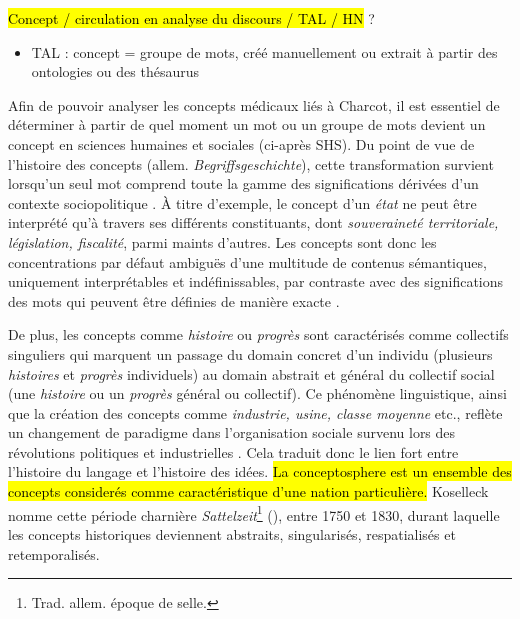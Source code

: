  \hl{Concept / circulation en analyse du discours / TAL / HN} ?  
\begin{itemize}
\item TAL : concept = groupe de mots, créé manuellement ou extrait à partir des ontologies ou des thésaurus
\end{itemize}



Afin de pouvoir analyser les concepts médicaux liés à Charcot, il est essentiel de déterminer à partir de quel moment un mot ou un groupe de mots devient un concept en sciences humaines et sociales (ci-après SHS). Du point de vue de l'histoire des concepts (allem. \textit{Begriffsgeschichte}), cette transformation survient lorsqu'un seul mot comprend toute la gamme des significations dérivées d'un contexte sociopolitique \citep[p. 258]{koselleck2011introduction}. À titre d'exemple, le concept d'un \textit{état} ne peut être interprété qu'à travers ses différents constituants, dont \textit{souveraineté territoriale, législation, fiscalité}, parmi maints d'autres. Les concepts sont donc les concentrations par défaut ambiguës d'une multitude de contenus sémantiques, uniquement interprétables et indéfinissables, par contraste avec des significations des mots qui peuvent être définies de manière exacte \citep[p. 20]{koselleck2011introduction}. 

De plus, les concepts comme \textit{histoire} ou \textit{progrès} sont caractérisés comme \og{}collectifs singuliers\fg{} qui marquent un passage du domain concret d'un individu (plusieurs \textit{histoires} et \textit{progrès} individuels) au domain abstrait et général du collectif social (une \textit{histoire} ou un \textit{progrès} général ou collectif).  Ce phénomène linguistique, ainsi que la création des concepts comme \textit{industrie, usine, classe moyenne} etc., reflète un changement de paradigme dans l'organisation sociale survenu lors des révolutions politiques et industrielles \citep[p. 1]{hobsbawm2010age}. Cela traduit donc le lien fort entre l'histoire du langage et l'histoire des idées. \hl{La conceptosphere est un ensemble des concepts considerés comme caractéristique d'une nation particulière.} Koselleck nomme cette période charnière \textit{Sattelzeit}\footnote{Trad. allem. \og{}époque de selle\fg{}.} (\citeyear[p. 8]{koselleck2011introduction}), entre 1750 et 1830, durant laquelle les concepts historiques deviennent abstraits, singularisés, respatialisés et retemporalisés.
 
